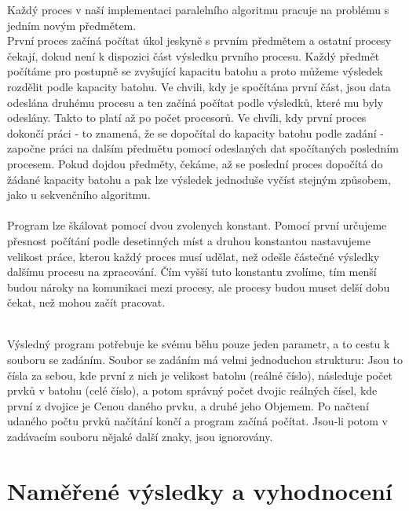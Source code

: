 \documentclass[12pt]{article}
\begin{document}
Každý proces v naší implementaci paralelního algoritmu pracuje na problému s jedním novým předmětem.\\
První proces začíná počítat úkol jeskyně s prvním předmětem a ostatní procesy čekají, dokud není k dispozici část výsledku prvního procesu. Každý předmět počítáme pro postupně se zvyšující kapacitu batohu a proto můžeme výsledek rozdělit podle kapacity batohu. Ve chvili, kdy je spočítána první část, jsou data odeslána druhému procesu a ten začíná počítat podle výsledků, které mu byly odeslány. Takto to platí až po počet procesorů. Ve chvíli, kdy první proces dokončí práci - to znamená, že se dopočítal do kapacity batohu podle zadání - započne práci na dalším předmětu pomocí odeslaných dat spočítaných posledním procesem. Pokud dojdou předměty, čekáme, až se poslední proces dopočítá do žádané kapacity batohu a pak lze výsledek jednoduše vyčíst stejným způsobem, jako u sekvenčního algoritmu. \\
\\
Program lze škálovat pomocí dvou zvolenych konstant. Pomocí první určujeme přesnost počítání podle desetinných míst a druhou konstantou nastavujeme velikost práce, kterou každý proces musí udělat, než odešle částečné výsledky dalšímu procesu na zpracování. Čím vyšší tuto konstantu zvolíme, tím menší budou nároky na komunikaci mezi procesy, ale procesy budou muset delší dobu čekat, než mohou začít pracovat.
\\
\\

Výsledný program potřebuje ke svému běhu pouze jeden parametr, a to cestu k souboru se zadáním. Soubor se zadáním má velmi jednoduchou strukturu: Jsou to čísla za sebou, kde první z nich je velikost batohu (reálné číslo), následuje počet prvků v batohu (celé číslo), a potom správný počet dvojic reálných čísel, kde první z dvojice je Cenou daného prvku, a druhé jeho Objemem. Po načtení udaného počtu prvků načítání končí a program začíná počítat. Jsou-li potom v zadávacím souboru nějaké další znaky, jsou ignorovány.

\section{Naměřené výsledky a vyhodnocení}
\end{document}
